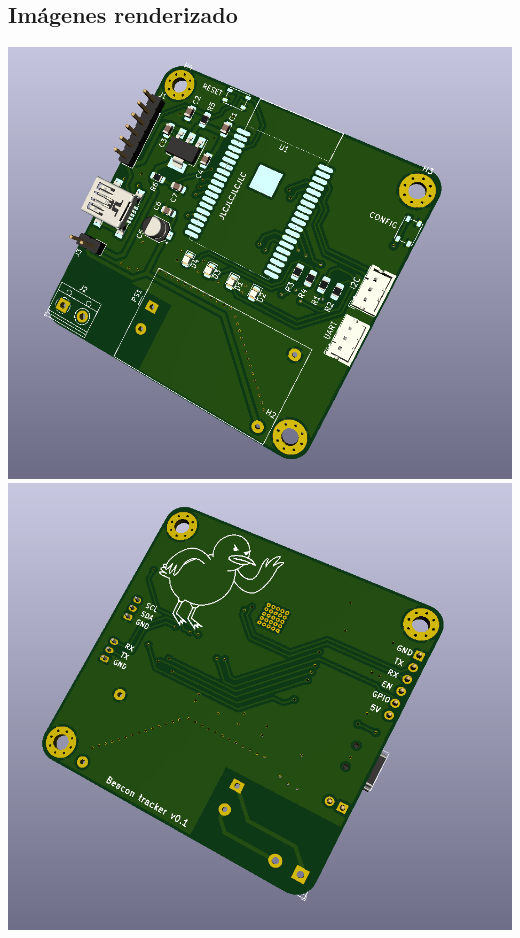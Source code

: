 \documentclass[a4paper ,12pt, onecolumn]{article}
\begin{document}
    \subsection{Imágenes renderizado}   
        \includegraphics[scale=0.4]{../receiver_1.PNG}
        \includegraphics[scale=0.4]{../receiver_2.PNG}
\end{document}
